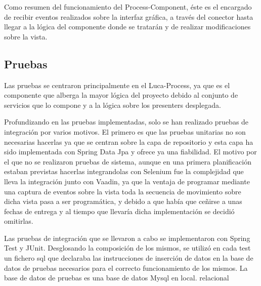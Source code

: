Como resumen del funcionamiento del Process-Component, éste es el encargado de recibir eventos realizados sobre la interfaz gráfica, a través del conector hasta llegar a la lógica del componente donde se tratarán y de realizar modificaciones sobre la vista.

	
\subsection{Pruebas}
	
	
	Las pruebas se centraron principalmente en el Luca-Process, ya que es el componente que alberga la mayor lógica del proyecto debido al conjunto de servicios que lo compone y a la lógica sobre los presenters desplegada.
	
	
	Profundizando en las pruebas implementadas, solo se han realizado pruebas de integración por varios motivos. El primero es que las pruebas unitarias no son necesarias hacerlas ya que se centran sobre la capa de repositorio y esta capa ha sido implementada con Spring Data Jpa\cite{jpa} y ofrece ya una fiabilidad. El motivo por el que no se realizaron pruebas de sistema, aunque en una primera planificación estaban previstas hacerlas integrandolas con Selenium\cite{selenium} fue la complejidad que lleva la integración junto con Vaadin\cite{vaadin}, ya que la ventaja de programar mediante una captura de eventos sobre la vista toda la secuencia de movimiento sobre dicha vista pasa a ser programática, y debido a que había que ceñirse a unas fechas de entrega y al tiempo que llevaría dicha implementación se decidió omitirlas.

	
	Las pruebas de integración que se llevaron a cabo se implementaron con Spring Test\cite{springTest} y JUnit\cite{junit}. Desglosando la composición de los mismos, se utilizó en cada test un fichero sql que declaraba las instrucciones de inserción de datos en la base de datos de pruebas necesarios para el correcto funcionamiento de los mismos. La base de datos de pruebas es una base de datos Mysql en local. relacional





	 